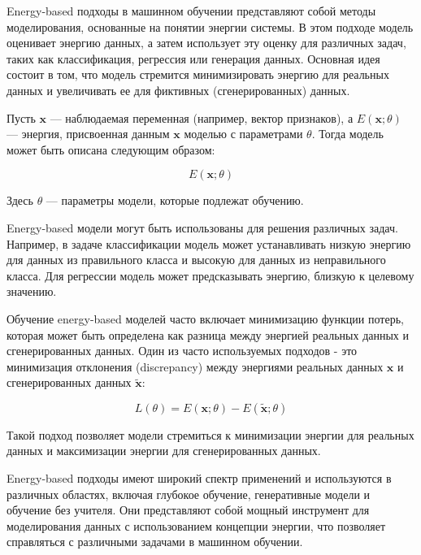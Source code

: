 Energy-based подходы в машинном обучении представляют собой методы моделирования, основанные на понятии энергии системы. В этом подходе модель оценивает энергию данных, а затем использует эту оценку для различных задач, таких как классификация, регрессия или генерация данных. Основная идея состоит в том, что модель стремится минимизировать энергию для реальных данных и увеличивать ее для фиктивных (сгенерированных) данных.

Пусть \( \mathbf{x} \) — наблюдаемая переменная (например, вектор признаков), а \( E(\mathbf{x}; \theta) \) — энергия, присвоенная данным \( \mathbf{x} \) моделью с параметрами \( \theta \). Тогда модель может быть описана следующим образом:

\[ E(\mathbf{x}; \theta) \]

Здесь \( \theta \) — параметры модели, которые подлежат обучению.

Energy-based модели могут быть использованы для решения различных задач. Например, в задаче классификации модель может устанавливать низкую энергию для данных из правильного класса и высокую для данных из неправильного класса. Для регрессии модель может предсказывать энергию, близкую к целевому значению.

Обучение energy-based моделей часто включает минимизацию функции потерь, которая может быть определена как разница между энергией реальных данных и сгенерированных данных. Один из часто используемых подходов - это минимизация отклонения (discrepancy) между энергиями реальных данных \( \mathbf{x} \) и сгенерированных данных \( \tilde{\mathbf{x}} \):

\[ L(\theta) = E(\mathbf{x}; \theta) - E(\tilde{\mathbf{x}}; \theta) \]

Такой подход позволяет модели стремиться к минимизации энергии для реальных данных и максимизации энергии для сгенерированных данных.

Energy-based подходы имеют широкий спектр применений и используются в различных областях, включая глубокое обучение, генеративные модели и обучение без учителя. Они представляют собой мощный инструмент для моделирования данных с использованием концепции энергии, что позволяет справляться с различными задачами в машинном обучении.
